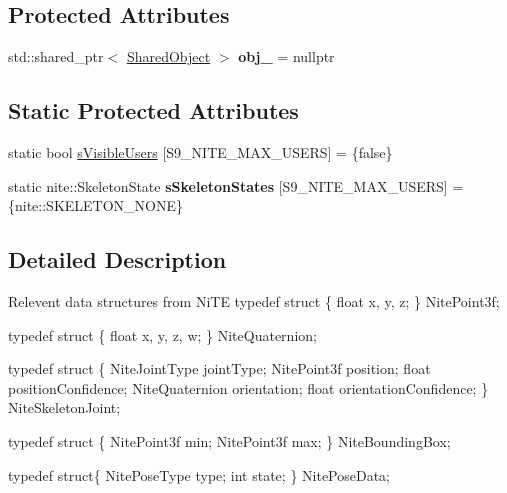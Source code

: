 \subsection*{Protected Attributes}
\begin{DoxyCompactItemize}
\item 
\hypertarget{classs9_1_1oni_1_1OpenNISkeleton_a5e24753efe4c7c86bff349a30264b39d}{std\-::shared\-\_\-ptr$<$ \hyperlink{structs9_1_1oni_1_1OpenNISkeleton_1_1SharedObject}{Shared\-Object} $>$ {\bfseries obj\-\_\-} = nullptr}\label{classs9_1_1oni_1_1OpenNISkeleton_a5e24753efe4c7c86bff349a30264b39d}

\end{DoxyCompactItemize}
\subsection*{Static Protected Attributes}
\begin{DoxyCompactItemize}
\item 
static bool \hyperlink{classs9_1_1oni_1_1OpenNISkeleton_af498eae1a18c58a6e85670d319392ca2}{s\-Visible\-Users} \mbox{[}S9\-\_\-\-N\-I\-T\-E\-\_\-\-M\-A\-X\-\_\-\-U\-S\-E\-R\-S\mbox{]} = \{false\}
\item 
\hypertarget{classs9_1_1oni_1_1OpenNISkeleton_a25dcf4c455ea86f97b50a10e0a421e38}{static nite\-::\-Skeleton\-State {\bfseries s\-Skeleton\-States} \mbox{[}S9\-\_\-\-N\-I\-T\-E\-\_\-\-M\-A\-X\-\_\-\-U\-S\-E\-R\-S\mbox{]} = \{nite\-::\-S\-K\-E\-L\-E\-T\-O\-N\-\_\-\-N\-O\-N\-E\}}\label{classs9_1_1oni_1_1OpenNISkeleton_a25dcf4c455ea86f97b50a10e0a421e38}

\end{DoxyCompactItemize}


\subsection{Detailed Description}
Relevent data structures from Ni\-T\-E typedef struct \{ float x, y, z; \} Nite\-Point3f;

typedef struct \{ float x, y, z, w; \} Nite\-Quaternion;

typedef struct \{ Nite\-Joint\-Type joint\-Type; Nite\-Point3f position; float position\-Confidence; Nite\-Quaternion orientation; float orientation\-Confidence; \} Nite\-Skeleton\-Joint;

typedef struct \{ Nite\-Point3f min; Nite\-Point3f max; \} Nite\-Bounding\-Box;

typedef struct\{ Nite\-Pose\-Type type; int state; \} Nite\-Pose\-Data;

